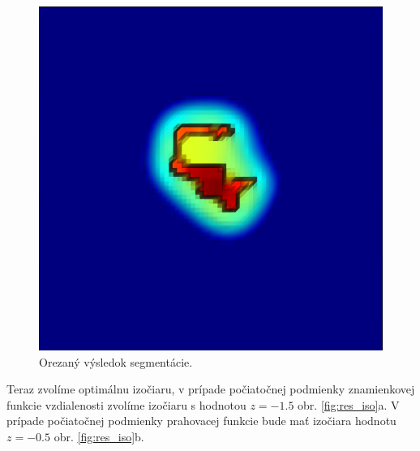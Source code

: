 \documentclass[a4paper,11pt,oneside]{article}%
\begin{document}
 
\begin{figure}[H]
 \begin{center} 
 \includegraphics[scale=0.30]{pics/pr_subsurf_cut.png}
\caption{Orezaný výsledok segmentácie.}
\label{fig:res_cut}
\end{center} 
\end{figure}

Teraz zvolíme optimálnu izočiaru, v prípade počiatočnej podmienky znamienkovej funkcie vzdialenosti zvolíme izočiaru s hodnotou $z = -1.5$ obr. \ref{fig:res_iso}a. V prípade počiatočnej podmienky prahovacej funkcie bude mať izočiara hodnotu $z = -0.5$ obr. \ref{fig:res_iso}b. 
\end{document}
